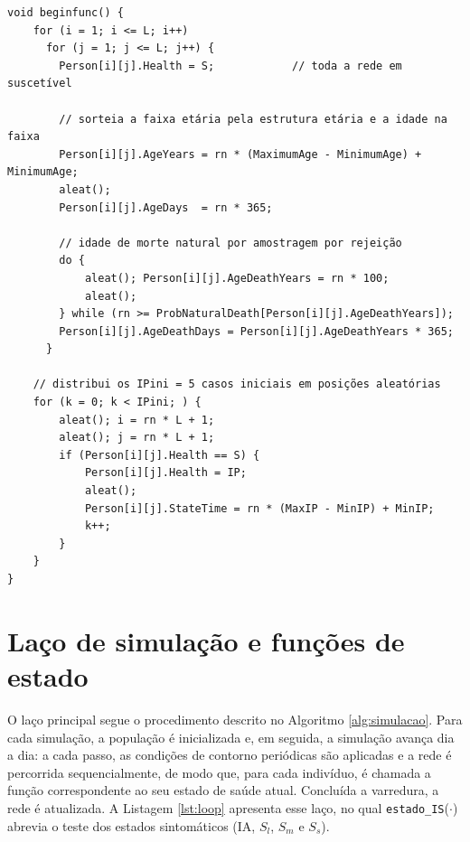 \begin{lstlisting}[caption={Inicialização da população (\texttt{beginfunc}).}, label={lst:begin}]
void beginfunc() {
    for (i = 1; i <= L; i++)
      for (j = 1; j <= L; j++) {
        Person[i][j].Health = S;            // toda a rede em suscetível

        // sorteia a faixa etária pela estrutura etária e a idade na faixa
        Person[i][j].AgeYears = rn * (MaximumAge - MinimumAge) + MinimumAge;
        aleat();
        Person[i][j].AgeDays  = rn * 365;

        // idade de morte natural por amostragem por rejeição
        do {
            aleat(); Person[i][j].AgeDeathYears = rn * 100;
            aleat();
        } while (rn >= ProbNaturalDeath[Person[i][j].AgeDeathYears]);
        Person[i][j].AgeDeathDays = Person[i][j].AgeDeathYears * 365;
      }

    // distribui os IPini = 5 casos iniciais em posições aleatórias
    for (k = 0; k < IPini; ) {
        aleat(); i = rn * L + 1;
        aleat(); j = rn * L + 1;
        if (Person[i][j].Health == S) {
            Person[i][j].Health = IP;
            aleat();
            Person[i][j].StateTime = rn * (MaxIP - MinIP) + MinIP;
            k++;
        }
    }
}
\end{lstlisting}

\section{Laço de simulação e funções de estado}

O laço principal segue o procedimento descrito no Algoritmo \ref{alg:simulacao}. Para cada simulação, a população é inicializada e, em seguida, a simulação avança dia a dia: a cada passo, as condições de contorno periódicas são aplicadas e a rede é percorrida sequencialmente, de modo que, para cada indivíduo, é chamada a função correspondente ao seu estado de saúde atual. Concluída a varredura, a rede é atualizada. A Listagem \ref{lst:loop} apresenta esse laço, no qual \texttt{estado\_IS}($\cdot$) abrevia o teste dos estados sintomáticos (IA, $S_l$, $S_m$ e $S_s$).

